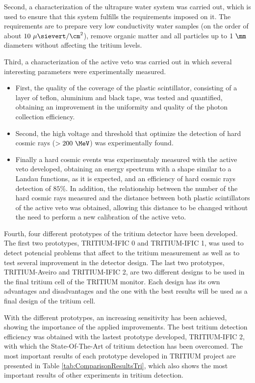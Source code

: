 Second, a characterization of the ultrapure water system was carried out, which is used to ensure that this system fulfills the requirements imposed on it. The requirements are to prepare very low conductivity water samples (on the order of about $10~\mu\sievert/\cm^2$), remove organic matter and all particles up to $1~\mm$ diameters without affecting the tritium levels.

Third, a characterization of the active veto was carried out in which several interesting parameters were experimentally measured.

\begin{itemize}

\item{} First, the quality of the coverage of the plastic scintillator, consisting of a layer of teflon, aluminium and black tape, was tested and quantified, obtaining an improvement in the uniformity and quality of the photon collection efficiency.

\item{} Second, the high voltage and threshold that optimize the detection of hard cosmic rays ($>200~\MeV$) was experimentally found.

\item{} Finally a hard cosmic events was experimentaly measured with the active veto developed, obtaining an energy spectrum with a shape similar to a Landau functions, as it is expected, and an efficiency of hard cosmic rays detection of $85\%$. In addition, the relationship between the number of the hard cosmic rays measured and the distance between both plastic scintillators of the active veto was obtained, allowing this distance to be changed without the need to perform a new calibration of the active veto.

\end{itemize}

Fourth, four different prototypes of the tritium detector have been developed. The first two prototypes, TRITIUM-IFIC 0 and TRITIUM-IFIC 1, was used to detect potencial problems that affect to the tritium measurement as well as to test several improvement in the detector design. The last two prototypes, TRITIUM-Aveiro and TRITIUM-IFIC 2, are two different designs to be used in the final tritium cell of the TRITIUM monitor. Each design has its own advantages and disadvantages and the one with the best results will be used as a final design of the tritium cell.

With the different prototypes, an increasing sensitivity has been achieved, showing the importance of the applied improvements. The best tritium detection efficiency was obtained with the lastest prototype developed, TRITIUM-IFIC 2, with which the State-Of-The-Art of tritium detection has been overcomed. The most important results of each prototype developed in TRITIUM project are presented in Table \ref{tab:ComparisonResultsTri}, which also shows the most important results of other experiments in tritium detection.

